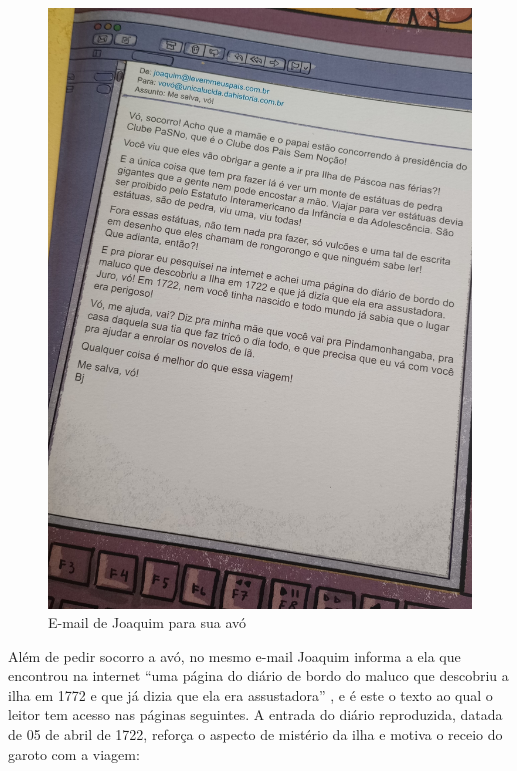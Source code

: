 \documentclass[portuguese]{textolivre}
\begin{document}
\begin{figure}[htbp]
  \centering
  \begin{minipage}{.75\textwidth}
    \includegraphics[width=\linewidth]{Fig2.jpeg}
    \caption{E-mail de Joaquim para sua avó}
    \label{fig2}
  \end{minipage}
\end{figure}

Além de pedir socorro a avó, no mesmo e-mail Joaquim informa a ela que
encontrou na internet “uma página do diário de bordo do maluco que descobriu a
ilha em 1772 e que já dizia que ela era assustadora”
\cite[p.~13]{franco_queda_2018}, e é este o texto ao qual o leitor tem acesso
nas páginas seguintes. A entrada do diário reproduzida, datada de 05 de abril
de 1722, reforça o aspecto de mistério da ilha e motiva o receio do garoto com
a viagem:
\end{document}
